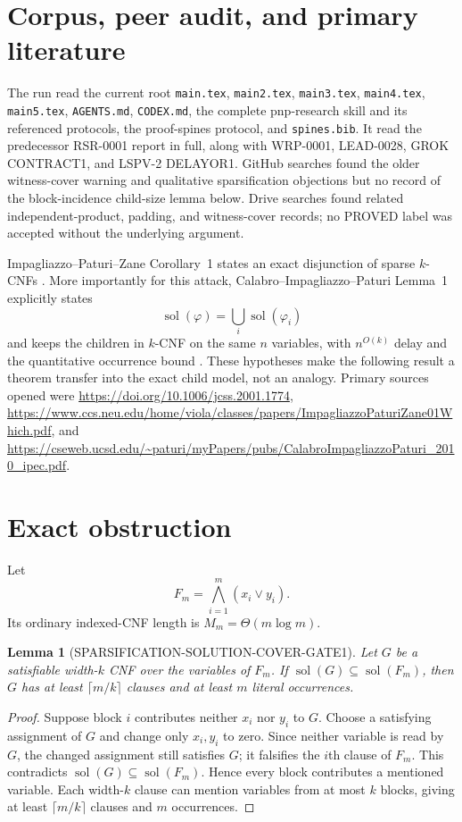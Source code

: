 \documentclass[11pt]{article}
\newtheorem{lemma}{Lemma}
\newcommand{\sol}{\operatorname{sol}}
\begin{document}
\section{Corpus, peer audit, and primary literature}
The run read the current root \texttt{main.tex}, \texttt{main2.tex},
\texttt{main3.tex}, \texttt{main4.tex}, \texttt{main5.tex},
\texttt{AGENTS.md}, \texttt{CODEX.md}, the complete pnp-research skill and
its referenced protocols, the proof-spines protocol, and \texttt{spines.bib}.
It read the predecessor RSR-0001 report in full, along with WRP-0001,
LEAD-0028, GROK CONTRACT1, and LSPV-2 DELAYOR1.  GitHub searches found the
older witness-cover warning and qualitative sparsification objections but no
record of the block-incidence child-size lemma below.  Drive searches found
related independent-product, padding, and witness-cover records; no PROVED
label was accepted without the underlying argument.

Impagliazzo--Paturi--Zane Corollary~1 states an exact disjunction of sparse
$k$-CNFs \cite{ipz2001}.  More importantly for this attack,
Calabro--Impagliazzo--Paturi Lemma~1 explicitly states
\[
 \sol(\varphi)=\bigcup_i\sol(\varphi_i)
\]
and keeps the children in $k$-CNF on the same $n$ variables, with
$n^{O(k)}$ delay and the quantitative occurrence bound
\cite{calabro2010}.  These hypotheses make the following result a theorem
transfer into the exact child model, not an analogy.  Primary sources opened
were
\url{https://doi.org/10.1006/jcss.2001.1774},
\url{https://www.ccs.neu.edu/home/viola/classes/papers/ImpagliazzoPaturiZane01Which.pdf},
and
\url{https://cseweb.ucsd.edu/~paturi/myPapers/pubs/CalabroImpagliazzoPaturi_2010_ipec.pdf}.

\section{Exact obstruction}
Let
\[
 F_m=\bigwedge_{i=1}^{m}(x_i\vee y_i).
\]
Its ordinary indexed-CNF length is $M_m=\Theta(m\log m)$.

\begin{lemma}[SPARSIFICATION-SOLUTION-COVER-GATE1]
Let $G$ be a satisfiable width-$k$ CNF over the variables of $F_m$.  If
$\sol(G)\subseteq\sol(F_m)$, then $G$ has at least
$\lceil m/k\rceil$ clauses and at least $m$ literal occurrences.
\end{lemma}
\begin{proof}
Suppose block $i$ contributes neither $x_i$ nor $y_i$ to $G$.  Choose a
satisfying assignment of $G$ and change only $x_i,y_i$ to zero.  Since neither
variable is read by $G$, the changed assignment still satisfies $G$; it
falsifies the $i$th clause of $F_m$.  This contradicts
$\sol(G)\subseteq\sol(F_m)$.  Hence every block contributes a mentioned
variable.  Each width-$k$ clause can mention variables from at most $k$
blocks, giving at least $\lceil m/k\rceil$ clauses and $m$ occurrences.
\end{proof}
\end{document}
